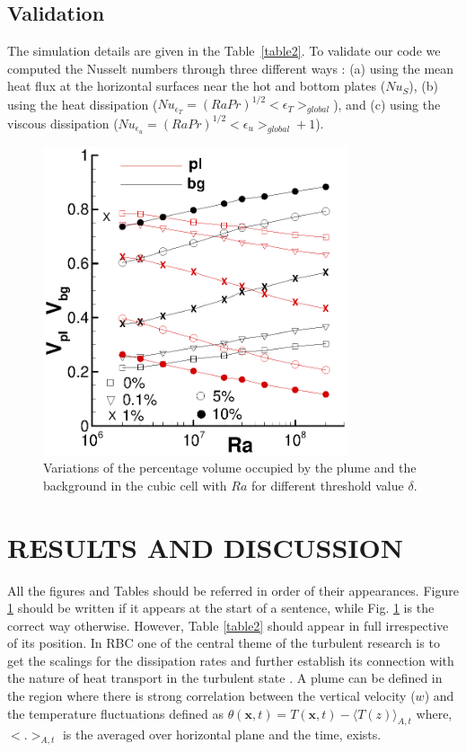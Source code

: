 \documentclass[10pt, conference]{FMFP2022}
\begin{document}
\subsection{\textbf{Validation}}\label{sec2p1}
The simulation details are given in the Table~\ref{table2}. To validate our code we computed the Nusselt numbers through three different ways \cite{Panton2009}: (a) using the mean heat flux at the horizontal surfaces near the hot and bottom plates ($Nu_S$), (b) using the heat dissipation ($Nu_{\epsilon_T}={(RaPr)}^{1/2}<\epsilon_T>_{global}$), and (c) using the viscous dissipation ($Nu_{\epsilon_u}={(RaPr)}^{1/2}<\epsilon_u>_{global}+1$).

\begin{figure}
\centering
\includegraphics[width=0.8\textwidth]{figure1.eps}
\caption{Variations of the percentage volume occupied by the plume and the background in the cubic cell with $Ra$ for different threshold value $\delta$.}
\label{figure1}
\end{figure} 

\section{\textbf{RESULTS AND DISCUSSION}}\label{sec3}
All the figures and Tables should be referred in order of their appearances. Figure \ref{figure1} should be written if it appears at the start of a sentence, while Fig. \ref{figure1} is the correct way otherwise. However, Table \ref{table2} should appear in full irrespective of its position. In RBC one of the central theme of the turbulent research is to get the scalings for the dissipation rates and further establish its connection with the nature of heat transport in the turbulent state \cite{Pascal2000}. A plume can be defined in the region where there is strong correlation between the vertical velocity ($w$) and the temperature fluctuations defined as  $\theta(\textbf{x},t)=T(\textbf{x},t)-\langle T(z)\rangle_{A,t}$ where, $<.>_{A,t}$ is the averaged over horizontal plane and the time, exists. 
\end{document}
